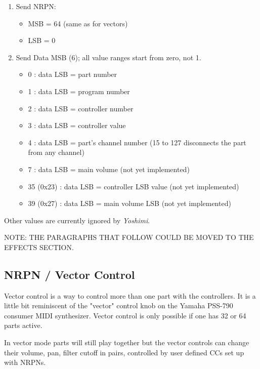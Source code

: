    \begin{enumerate}
      \item Send NRPN: 
      \begin{itemize}
         \item MSB = 64 (same as for vectors)
         \item LSB = 0
      \end{itemize}
      \item Send Data MSB (6); all value ranges start from zero, not 1.
      \begin{itemize}
         \item 0 : data LSB = part number
         \item 1 : data LSB = program number
         \item 2 : data LSB = controller number
         \item 3 : data LSB = controller value
         \item 4 : data LSB = part's channel number (15 to 127 disconnects
            the part from any channel)
         \item 7 : data LSB = main volume (not yet implemented)
         \item 35 (0x23) : data LSB = controller LSB value (not yet implemented)
         \item 39 (0x27) : data LSB = main volume LSB (not yet implemented)
      \end{itemize}
   \end{enumerate}

   Other values are currently ignored by \textsl{Yoshimi}.

   NOTE:  THE PARAGRAPHS THAT FOLLOW COULD BE MOVED TO THE EFFECTS SECTION.

\subsection{NRPN / Vector Control}
\label{subsection:nrpns_midi_nrpn_vector_control}

   Vector control is a way to control more than one part with the
   controllers.
   It is a little bit reminiscent of the "vector" control knob on the 
   Yamaha PSS-790 consumer MIDI synthesizer.
   Vector control is only possible if one has 32 or 64 parts active.

   In vector mode parts will still play together but the vector controls can
   change their volume, pan, filter cutoff in pairs, controlled by user
   defined CCs set up with NRPNs.

